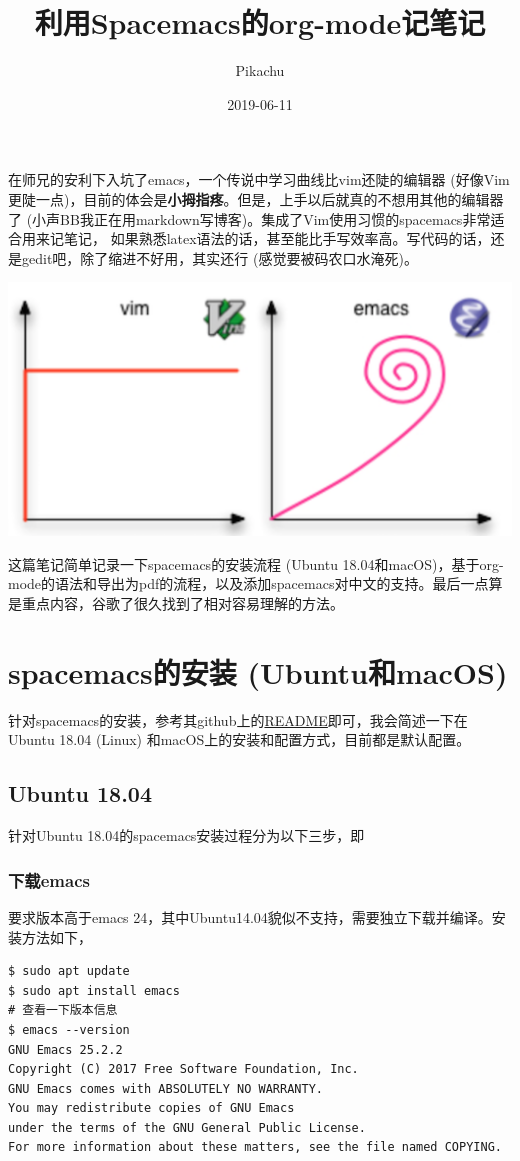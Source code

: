\documentclass[11pt]{article}
\author{Pikachu}
\date{2019-06-11}
\title{利用Spacemacs的org-mode记笔记}
\begin{document}
\maketitle
\tableofcontents

\newpage
在师兄的安利下入坑了emacs，一个传说中学习曲线比vim还陡的编辑器 (好像Vim更陡一点)，目前的体会是\textbf{小拇指疼}。但是，上手以后就真的不想用其他的编辑器了 (小声BB我正在用markdown写博客)。集成了Vim使用习惯的spacemacs非常适合用来记笔记，
如果熟悉latex语法的话，甚至能比手写效率高。写代码的话，还是gedit吧，除了缩进不好用，其实还行 (感觉要被码农口水淹死)。

\begin{center}
\includegraphics[width=.9\linewidth]{./fig1.png}
\end{center}

这篇笔记简单记录一下spacemacs的安装流程 (Ubuntu 18.04和macOS)，基于org-mode的语法和导出为pdf的流程，以及添加spacemacs对中文的支持。最后一点算是重点内容，谷歌了很久找到了相对容易理解的方法。

\section{spacemacs的安装 (Ubuntu和macOS)}
\label{sec:org1bf3e42}
针对spacemacs的安装，参考其github上的\href{https://github.com/syl20bnr/spacemacs\#default-installation}{README}即可，我会简述一下在Ubuntu 18.04 (Linux) 和macOS上的安装和配置方式，目前都是默认配置。

\subsection{Ubuntu 18.04}
\label{sec:org38e2e7a}
针对Ubuntu 18.04的spacemacs安装过程分为以下三步，即

\subsubsection{下载emacs}
\label{sec:org37a984e}
要求版本高于emacs 24，其中Ubuntu14.04貌似不支持，需要独立下载并编译。安装方法如下，
\begin{center}
\begin{verbatim}
$ sudo apt update
$ sudo apt install emacs
# 查看一下版本信息
$ emacs --version
GNU Emacs 25.2.2
Copyright (C) 2017 Free Software Foundation, Inc.
GNU Emacs comes with ABSOLUTELY NO WARRANTY.
You may redistribute copies of GNU Emacs
under the terms of the GNU General Public License.
For more information about these matters, see the file named COPYING.
\end{verbatim}
\end{center}
\end{document}
